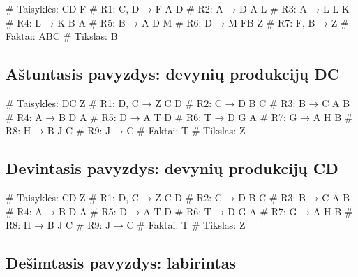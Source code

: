 \begin{pythonaienv}[fc]
# Taisyklės:
CD F                                    # R1: C, D → F
A D                                     # R2: A → D
A L                                     # R3: A → L
L K                                     # R4: L → K
B A                                     # R5: B → A
D M                                     # R6: D → M
FB Z                                    # R7: F, B → Z
# Faktai:
ABC
# Tikslas:
B
\end{pythonaienv}

\subsection{Aštuntasis pavyzdys: devynių produkcijų DC}

\begin{pythonaienv}[fc]
# Taisyklės:
DC Z                                    # R1: D, C → Z
C D                                     # R2: C → D
B C                                     # R3: B → C
A B                                     # R4: A → B
D A                                     # R5: D → A
T D                                     # R6: T → D
G A                                     # R7: G → A
H B                                     # R8: H → B
J C                                     # R9: J → C
# Faktai:
T
# Tikslas:
Z
\end{pythonaienv}

\subsection{Devintasis pavyzdys: devynių produkcijų CD}

\begin{pythonaienv}[fc]
# Taisyklės:
CD Z                                    # R1: D, C → Z
C D                                     # R2: C → D
B C                                     # R3: B → C
A B                                     # R4: A → B
D A                                     # R5: D → A
T D                                     # R6: T → D
G A                                     # R7: G → A
H B                                     # R8: H → B
J C                                     # R9: J → C
# Faktai:
T
# Tikslas:
Z
\end{pythonaienv}

\subsection{Dešimtasis pavyzdys: labirintas}

